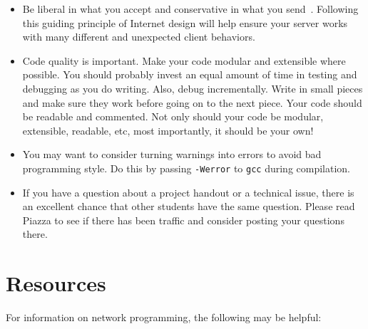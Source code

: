 \begin{itemize}
	\item Be liberal in what you accept and conservative in what you
      send~\cite{RFC:1122}.  Following this guiding principle of Internet design
      will help ensure your server works with many different and unexpected
      client behaviors.

	\item Code quality is important. Make your code modular and extensible where
      possible. You should probably invest an equal amount of time in testing
      and debugging as you do writing. Also, debug incrementally.  Write in
      small pieces and make sure they work before going on to the next piece.
      Your code should be readable and commented. Not only should your code be
      modular, extensible, readable, etc, most importantly, it should be your
      own!

    \item You may want to consider turning warnings into errors to avoid bad
	  programming style. Do this by passing \texttt{-Werror} to \texttt{gcc}
	  during compilation.

	\item If you have a question about a project handout or a technical issue,
	  there is an excellent chance that other students have the same question.
	  Please read Piazza to see if there has been traffic and consider posting
	  your questions there.

\end{itemize}

\section{Resources}
For information on network programming, the following may be helpful:

